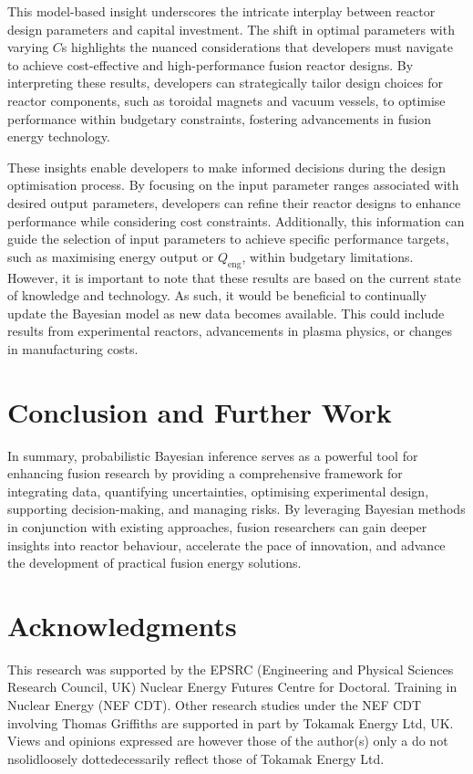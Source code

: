 \documentclass[journal]{IEEEtran}
\begin{document}
This model-based insight underscores the intricate interplay between reactor design parameters and capital investment. The shift in optimal parameters with varying $C$s highlights the nuanced considerations that developers must navigate to achieve cost-effective and high-performance fusion reactor designs. By interpreting these results, developers can strategically tailor design choices for reactor components, such as toroidal magnets and vacuum vessels, to optimise performance within budgetary constraints, fostering advancements in fusion energy technology.

These insights enable developers to make informed decisions during the design optimisation process. By focusing on the input parameter ranges associated with desired output parameters, developers can refine their reactor designs to enhance performance while considering cost constraints. Additionally, this information can guide the selection of input parameters to achieve specific performance targets, such as maximising energy output or $Q_{\text{eng}}$, within budgetary limitations. However, it is important to note that these results are based on the current state of knowledge and technology. As such, it would be beneficial to continually update the Bayesian model as new data becomes available. This could include results from experimental reactors, advancements in plasma physics, or changes in manufacturing costs.

\section{Conclusion and Further Work}\label{sec:conc}

In summary, probabilistic Bayesian inference serves as a powerful tool for enhancing fusion research by providing a comprehensive framework for integrating data, quantifying uncertainties, optimising experimental design, supporting decision-making, and managing risks. By leveraging Bayesian methods in conjunction with existing approaches, fusion researchers can gain deeper insights into reactor behaviour, accelerate the pace of innovation, and advance the development of practical fusion energy solutions.

\section{Acknowledgments}
This research was supported by the EPSRC (Engineering and Physical Sciences Research Council, UK) Nuclear Energy Futures Centre for Doctoral. Training in Nuclear Energy (NEF CDT). Other research studies under the NEF CDT involving Thomas Griffiths are supported in part by Tokamak Energy Ltd, UK. Views and opinions expressed are however those of the author(s) only a do not nsolidloosely dottedecessarily reflect those of Tokamak Energy Ltd.



\end{document}
